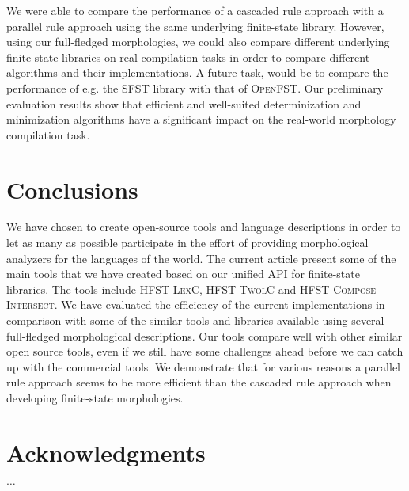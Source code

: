 \documentclass[postprint]{flammie}
\begin{document}
We were able to compare the performance of a cascaded rule approach
with a parallel rule approach using the same underlying finite-state
library. However, using our full-fledged morphologies, we could also
compare different underlying finite-state libraries on real
compilation tasks in order to compare different algorithms and their
implementations. A future task, would be to compare the performance of
e.g. the \textsc{SFST} library with that of \textsc{OpenFST}.  Our
preliminary evaluation results show that efficient and well-suited
determinization and minimization algorithms have a significant impact
on the real-world morphology compilation task.

\section{Conclusions}

We have chosen to create open-source tools and language descriptions
in order to let as many as possible participate in the effort of
providing morphological analyzers for the languages of the world. The
current article present some of the main tools that we have created
based on our unified API for finite-state libraries. The tools include
\textsc{HFST-LexC}, \textsc{HFST-TwolC} and
\textsc{HFST-Compose-Intersect}. We have evaluated the efficiency of
the current implementations in comparison with some of the similar
tools and libraries available using several full-fledged morphological
descriptions. Our tools compare well with other similar open source
tools, even if we still have some challenges ahead before we can catch
up with the commercial tools. We demonstrate that for various reasons
a parallel rule approach seems to be more efficient than the cascaded
rule approach when developing finite-state morphologies.

\section*{Acknowledgments}

$\ldots$
\end{document}
